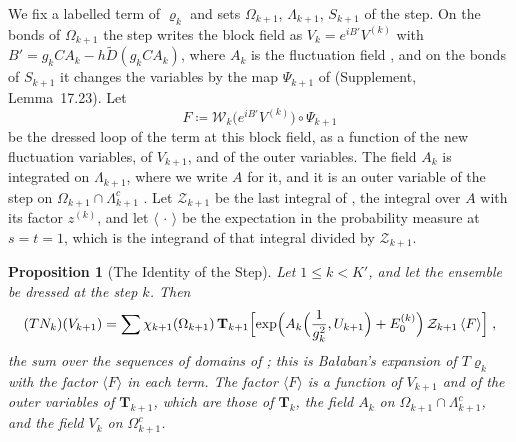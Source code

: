 \documentclass[11pt]{preprint}
\numberwithin{equation}{section}
\newtheorem{proposition}[theorem]{Proposition}
\theoremstyle{definition}
\theoremstyle{remark}
\theoremstyle{plain}
\begin{document}
We fix a labelled term of $\varrho_k$ and sets $\Omega_{k+1}$, $\Lambda_{k+1}$, $S_{k+1}$ of the step. On the bonds of $\Omega_{k+1}$ the step writes the block field as $V_k = e^{iB'}V^{(k)}$ with $B' = g_kCA_k - h\tilde D(g_kCA_k)$, where $A_k$ is the fluctuation field \cite[(3.11), p.~266; (3.15), pp.~267--268]{BalabanCRE}, and on the bonds of $S_{k+1}$ it changes the variables by the map $\Psi_{k+1}$ of \cite[p.~269]{BalabanCRE} (Supplement, Lemma~17.23). Let
\begin{equation}\label{eq:carried-loop}
    F \coloneqq \mathcal W_k\bigl(e^{iB'}V^{(k)}\bigr) \circ \Psi_{k+1}
\end{equation}
be the dressed loop of the term at this block field, as a function of the new fluctuation variables, of $V_{k+1}$, and of the outer variables. The field $A_k$ is integrated on $\Lambda_{k+1}$, where we write $A$ for it, and it is an outer variable of the step on $\Omega_{k+1} \cap \Lambda_{k+1}^c$ \cite[p.~270]{BalabanCRE}. Let $\mathcal Z_{k+1}$ be the last integral of \cite[(3.25), p.~270]{BalabanCRE}, the integral over $A$ with its factor $z^{(k)}$, and let $\langle\,\cdot\,\rangle$ be the expectation in the probability measure \cite[(3.27), p.~271]{BalabanCRE} at $s = t = 1$, which is the integrand of that integral divided by $\mathcal Z_{k+1}$.

\begin{proposition}[The Identity of the Step]\label{prop:step-identity}
Let $1 \leq k < K'$, and let the ensemble be dressed at the step $k$. Then
\begin{equation}\label{eq:carried-step}
    (TN_k)(V_{k+1}) = \sum\chi_{k+1}(\Omega_{k+1})\,\mathbf T_{k+1}\Bigl[\exp\Bigl(A_k\Bigl(\frac{1}{g_k^2}, U_{k+1}\Bigr) + E_0^{(k)}\Bigr)\,\mathcal Z_{k+1}\,\langle F\rangle\Bigr]\;,
\end{equation}
the sum over the sequences of domains of \cite[(3.25)]{BalabanCRE}; this is Ba{\l}aban's expansion of $T\varrho_k$ with the factor $\langle F\rangle$ in each term. The factor $\langle F\rangle$ is a function of $V_{k+1}$ and of the outer variables of $\mathbf T_{k+1}$, which are those of $\mathbf T_k$, the field $A_k$ on $\Omega_{k+1} \cap \Lambda_{k+1}^c$, and the field $V_k$ on $\Omega_{k+1}^c$.
\end{proposition}
\end{document}
